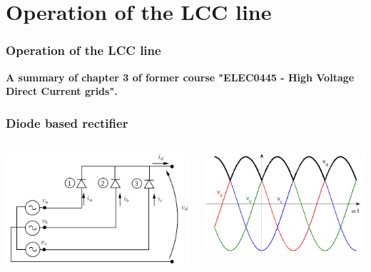 \section{Operation of the LCC line}

\begin{frame}[fragile]
\frametitle{Operation of the LCC line}
\begin{center}
\textbf{A summary of chapter 3 of former course "ELEC0445 - High Voltage Direct Current grids".}
\end{center}
\end{frame}

\begin{frame}
\frametitle{Diode based rectifier}
\begin{columns}
\begin{column}{0.5\linewidth}
\begin{center}
    \includegraphics[width=1.0\linewidth]{images/3pulseconv.png}
\end{center}
\end{column}
\begin{column}{0.5\linewidth}
\begin{center}
    \includegraphics[width=0.7\linewidth]{images/3pulsevred.png}

\end{center}
\end{column}
\end{columns}
\end{frame}
